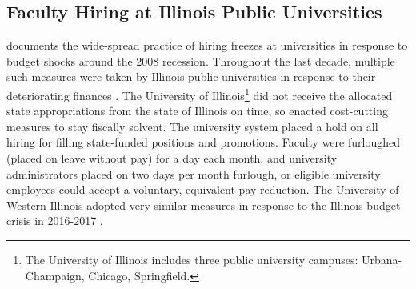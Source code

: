 \subsection{Faculty Hiring at Illinois Public Universities}

\cite{turner2014impact} documents the wide-spread practice of hiring freezes at universities in response to budget shocks around the 2008 recession.
Throughout the last decade, multiple such measures were taken by Illinois public universities in response to their deteriorating finances \citep{furlough2010}.
The University of Illinois\footnote{
    The University of Illinois includes three public university campuses: Urbana-Champaign, Chicago, Springfield.
}
did not receive the allocated state appropriations from the state of Illinois on time, so enacted cost-cutting measures to stay fiscally solvent.
The university system placed a hold on all hiring for filling state-funded positions and promotions.
Faculty were furloughed (placed on leave without pay) for a day each month, and university administrators placed on two days per month furlough, or eligible university employees could accept a voluntary, equivalent pay reduction.
The University of Western Illinois adopted very similar measures in response to the Illinois budget crisis in 2016-2017 \citep{wiu2016}.

